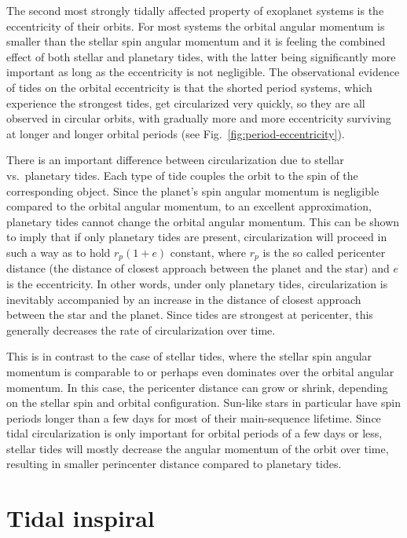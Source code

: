 The second most strongly tidally affected property of exoplanet systems is the
eccentricity of their orbits. For most systems the orbital angular momentum is
smaller than the stellar spin angular momentum and it is feeling the combined
effect of both stellar and planetary tides, with the latter being significantly
more important as long as the eccentricity is not negligible. The observational
evidence of tides on the orbital eccentricity is that the shorted period
systems, which experience the strongest tides, get circularized very quickly, so
they are all observed in circular orbits, with gradually more and more
eccentricity surviving at longer and longer orbital periods (see
Fig.~\ref{fig:period-eccentricity}).

There is an important difference between circularization due to stellar vs.\
planetary tides. Each type of tide couples the orbit to the spin of the
corresponding object. Since the planet's spin angular momentum is negligible
compared to the orbital angular momentum, to an excellent approximation,
planetary tides cannot change the orbital angular momentum. This can be shown to
imply that if only planetary tides are present, circularization will proceed in
such a way as to hold $r_p(1+e)$ constant, where $r_p$ is the so called
pericenter distance (the distance of closest approach between the planet and the
star) and $e$ is the eccentricity. In other words, under only planetary tides,
circularization is inevitably accompanied by an increase in the distance of
closest approach between the star and the planet. Since tides are strongest at
pericenter, this generally decreases the rate of circularization over time.

This is in contrast to the case of stellar tides, where the stellar spin angular
momentum is comparable to or perhaps even dominates over the orbital angular
momentum. In this case, the pericenter distance can grow or shrink, depending on
the stellar spin and orbital configuration. Sun-like stars in particular have
spin periods longer than a few days for most of their main-sequence lifetime.
Since tidal circularization is only important for orbital periods of a few days
or less, stellar tides will mostly decrease the angular momentum of the orbit
over time, resulting in smaller perincenter distance compared to planetary
tides.

\section{Tidal inspiral}

